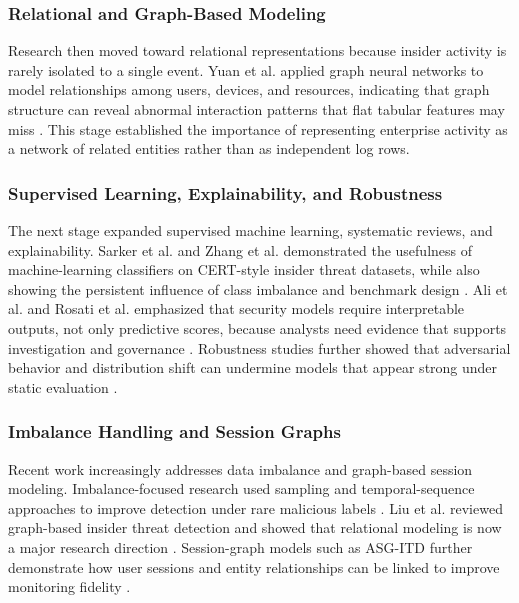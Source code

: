 \subsubsection{Relational and Graph-Based Modeling}
Research then moved toward relational representations because insider activity is rarely isolated to a single event. Yuan et al. applied graph neural networks to model relationships among users, devices, and resources, indicating that graph structure can reveal abnormal interaction patterns that flat tabular features may miss \cite{yuan2022gnn}. This stage established the importance of representing enterprise activity as a network of related entities rather than as independent log rows.

\subsubsection{Supervised Learning, Explainability, and Robustness}
The next stage expanded supervised machine learning, systematic reviews, and explainability. Sarker et al. and Zhang et al. demonstrated the usefulness of machine-learning classifiers on CERT-style insider threat datasets, while also showing the persistent influence of class imbalance and benchmark design \cite{sarker2023insider,zhang2023supervised}. Ali et al. and Rosati et al. emphasized that security models require interpretable outputs, not only predictive scores, because analysts need evidence that supports investigation and governance \cite{ali2023xai,rosati2023blackbox}. Robustness studies further showed that adversarial behavior and distribution shift can undermine models that appear strong under static evaluation \cite{apruzzese2023robustness,alani2023adversarial}.

\subsubsection{Imbalance Handling and Session Graphs}
Recent work increasingly addresses data imbalance and graph-based session modeling. Imbalance-focused research used sampling and temporal-sequence approaches to improve detection under rare malicious labels \cite{balanced2024imbalance}. Liu et al. reviewed graph-based insider threat detection and showed that relational modeling is now a major research direction \cite{liu2024graph}. Session-graph models such as ASG-ITD further demonstrate how user sessions and entity relationships can be linked to improve monitoring fidelity \cite{asg2024}.


